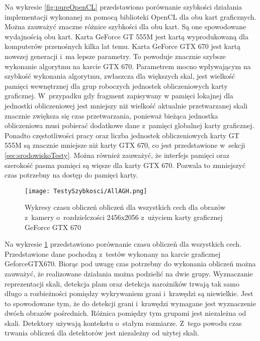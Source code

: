 Na wykresie \ref{fig:pureOpenCL} przedstawiono porównanie szybkości działania implementacji wykonanej za pomocą biblioteki OpenCL dla obu kart graficznych. Można zauważyć znaczne różnice szybkości dla obu kart. Są one spowodowane wydajnością obu kart. Karta GeForce GT 555M jest kartą wyprodukowaną dla komputerów przenośnych kilka lat temu. Karta GeForce GTX 670 jest kartą nowszej generacji i~ma lepsze parametry. To powoduje znacznie szybsze wykonanie algorytmu na karcie GTX 670. Parametrem mocno wpływającym na szybkość wykonania algorytmu, zwłaszcza dla większych skal, jest wielkość pamięci wewnętrznej dla grup roboczych jednostek obliczeniowych karty graficznej. W~przypadku gdy fragment zapisywany w pamięci lokajnej dla jednostki obliczeniowej jest mniejszy niż wielkość aktualnie przetwarzanej skali znacznie zwiększa się czas przetwarzania, ponieważ bieżąca jednostka obliczeniowa musi pobierać dodatkowe dane z~pamięci globalnej karty graficznej. Ponadto częstotliwości pracy oraz liczba jednostek obliczeniowych karty GT 555M są znacznie mniejsze niż karty GTX 670, co jest przedstawione w~sekcji \ref{sec:srodowiskoTesty}. Można również zauważyć, że interfejs pamięci oraz szerokość pasma pamięci są więsze dla karty GTX 670. Pozwala to zmniejszyć czas potrzebny na dostęp do pamięci karty.

\begin{figure}[b]
\begin{center}
\texttt{[image: TestySzybkosci/AllAGH.png]}
\end{center}
\caption{Wykresy czasu obliczeń obliczeń dla wszystkich cech dla obrazów z~kamery o~rozdzielczości 2456x2056 z~użyciem karty graficznej GeForce GTX 670}
\label{fig:AllAGH}
\end{figure}

Na wykresie \ref{fig:AllAGH} przedstawiono porównanie czasu obliczeń dla wszystkich cech. Przedstawione dane pochodzą z~testów wykonany na karcie graficznej GeforceGTX670. Biorąc pod uwagę czas potrzebny do wykonania obliczeń można zauważyć, że realizowane działania można podzielić na dwie grupy. Wyznaczanie reprezentacji skali, detekcja plam oraz detekcja narożników trwają tak samo długo a rozbieżności pomiędzy wykrywaniem grani i~krawędzi są niewielkie. Jest to spowodowane tym, że do detekcji grani i~krawędzi wymagane jest wyznaczenie dwóch obrazów pośrednich. Różnica pomiędzy tym grupami jest niezależna od skali. Detektory używają kontekstu o~stałym rozmiarze. Z~tego powodu czas trwania obliczeń dla detektorów jest niezależny od użytej skali.

